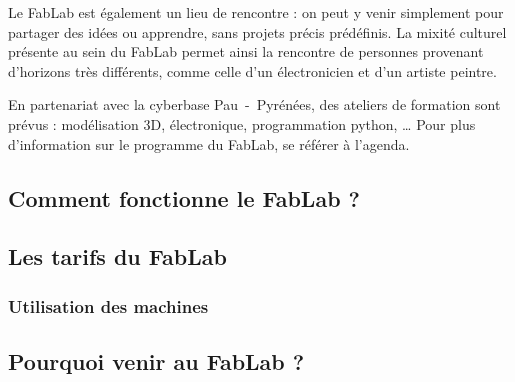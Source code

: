 Le FabLab est également un lieu de rencontre : on peut y venir simplement pour partager des idées ou apprendre, sans projets précis prédéfinis. La mixité culturel présente au sein du FabLab permet ainsi la rencontre de personnes provenant d'horizons très différents, comme celle d'un électronicien et d'un artiste peintre.

En partenariat avec la cyberbase Pau~-~Pyrénées, des ateliers de formation sont prévus : modélisation 3D, électronique, programmation python, \dots
Pour plus d'information sur le programme du FabLab, se référer à l'agenda.

\subsection{Comment fonctionne le FabLab ?}

\subsection{Les tarifs du FabLab}

\subsubsection{Utilisation des machines}

\subsection{Pourquoi venir au FabLab ?}
